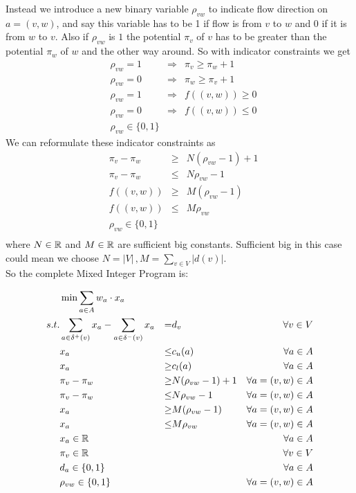 Instead we introduce a new binary variable $\rho_{vw}$ to indicate flow direction on $a=(v,w)$, and say this variable 
has to be 1 if flow is from $v$ to $w$ and 0 if it is from $w$ to $v$. Also if $\rho_{vw}$ is $1$ the potential 
$\pi_v$ of $v$ has to be greater than the potential $\pi_w$ of $w$ and the other way around. So with indicator 
constraints we get
\begin{align*}
 &\rho_{vw}=1 &\Rightarrow &\pi_v\ge\pi_w +1\\
 &\rho_{vw}=0 &\Rightarrow &\pi_w\ge\pi_v +1\\
 &\rho_{vw}=1 &\Rightarrow &f((v,w))\ge 0\\
 &\rho_{vw}=0 &\Rightarrow &f((v,w))\le 0\\
 &\rho_{vw} \in \{0,1\}&&
\end{align*}
We can reformulate these indicator constraints as
\begin{align*}
 &\pi_v-\pi_w &\ge & N(\rho_{vw}-1)+1\\
 &\pi_v-\pi_w&\le &N\rho_{vw}-1 \\
 &f((v,w))&\ge& M(\rho_{vw}-1)\\
 &f((v,w))&\le & M\rho_{vw}\\
 &\rho_{vw} \in \{0,1\}&&\\
\end{align*}
where $N\in \mathbb{R}$ and $M\in \mathbb{R}$ are sufficient big constants. Sufficient big in this case could mean we choose 
$N=|V|\, ,M=\sum_{v\in V}|d(v)|$. \\
So the complete Mixed Integer Program is:

\begin{align*}
  &\min \sum_{a\in A} w_a\cdot x_a & \\
 s.t. & \sum_{a\in \delta^+(v)}x_a - \sum_{a\in\delta^- (v)}x_a &=& d_v\ &\forall v\in V \\
 & x_a &\le& c_u(a) & \forall a\in A\\
 & x_a &\ge& c_l(a) & \forall a\in A\\
 & \pi_v-\pi_w &\ge & N(\rho_{vw}-1)+1& \forall a=(v,w)\in A\\
 & \pi_v-\pi_w&\le &N\rho_{vw}-1& \forall a=(v,w)\in A\\
 & x_a&\ge& M(\rho_{vw}-1)& \forall a=(v,w)\in A\\
 & x_a&\le & M\rho_{vw}& \forall a=(v,w)\in A\\
 & x_a \in \mathbb{R} & & &\forall a\in A\\
 & \pi_v \in \mathbb{R} & & & \forall v\in V\\
 & d_a \in \{0,1\} & & &\forall a\in A\\
 & \rho_{vw} \in \{0,1\}&&& \forall a=(v,w)\in A\\
\end{align*}

